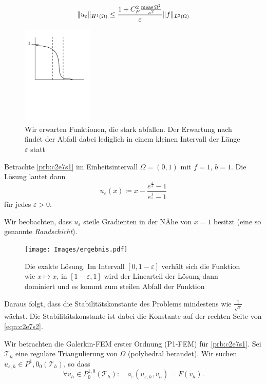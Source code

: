 \documentclass[../skript.tex]{subfiles}
\begin{document}
\begin{equation}\label{eqn:c2e7s2}
	\| u_\varepsilon\|_{H^1(\Omega)} \leq \frac{1+C_F^2\frac{\operatorname{meas}{\Omega}^2}{\pi^2}}{\varepsilon}\|f\|_{L^2(\Omega)}
\end{equation}
\begin{figure}[ht]
	\centering
	\includegraphics[width=0.3\textwidth]{Images/heuristik.pdf}
	\caption{Wir erwarten Funktionen, die stark abfallen. Der Erwartung nach findet der Abfall dabei lediglich in einem kleinen Intervall der Länge $\varepsilon$ statt}
	\label{figure_heuristik}
\end{figure}
\begin{example}\label{ex:c2e7s1}
	Betrachte \cref{prb:c2e7s1} im Einheitsintervall $\Omega=(0,1)$ mit $f=1$, $b=1$. Die Lösung lautet dann
	\[
		u_\varepsilon(x)\coloneqq x-\frac{e^{\frac{x}{\varepsilon}}-1}{e^{\frac{1}{\varepsilon}}-1}
	\]
	für jedes $\varepsilon > 0$.\par
	Wir beobachten, dass $u_\varepsilon$ steile Gradienten in der NÄhe von $x=1$ besitzt (eine so genannte \emph{Randschicht}).
	\begin{figure}[ht]
	\centering
		\texttt{[image: Images/ergebnis.pdf]}
		\caption{Die exakte Lösung. Im Intervall $[0,1-\varepsilon]$ verhält sich die Funktion wie $x\mapsto x$, in $[1-\varepsilon,1]$ wird der Linearteil der Lösung dann dominiert und es kommt zum steilen Abfall der Funktion}
		\label{figure_loesung}
	\end{figure}
	Daraus folgt, dass die Stabilitätskonstante des Problems mindestens wie $\frac{1}{\sqrt{\varepsilon}}$ wächst. Die Stabilitätskonstante ist dabei die Konstante auf der rechten Seite von \cref{eqn:c2e7s2}.
\end{example}
Wir betrachten die Galerkin-FEM erster Ordnung (P1-FEM) für \cref{prb:c2e7s1}. Sei $\mathcal{T}_h$ eine reguläre Triangulierung von $\Omega$ (polyhedral berandet). Wir suchen $u_{\varepsilon,h}\in P^1,0_0(\mathcal{T}_h)$, so dass 
\begin{equation}\label{eqn:c2e7s3}
	\forall v_h\in P^{1,0}_0(\mathcal{T}_h):\quad a_\varepsilon(u_{\varepsilon,h},v_h) = F(v_h).
\end{equation}
\end{document}
